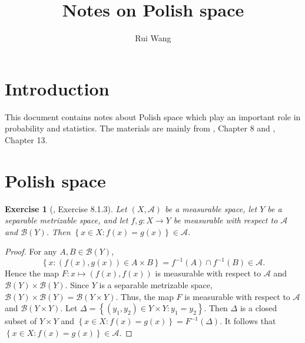 \documentclass[11pt]{article}
\theoremstyle{plain}
\newtheorem{exercise}{Exercise}
\theoremstyle{definition}
\theoremstyle{remark}
\begin{document}
\title{Notes on Polish space}

\author{Rui Wang}
\maketitle

\section{Introduction}
This document contains notes about Polish space which play an important role in probability and statistics.
The materials are mainly from \cite{book:992991}, Chapter 8 and \cite{dudleyProbability}, Chapter 13.

\section{Polish space}
\begin{exercise}[\cite{book:992991}, Exercise 8.1.3]
    Let $(X,\mathscr A)$ be a measurable space, let $Y$ be a separable metrizable space, and let $f,g: X \to Y$ be measurable with respect to $\mathscr A$ and $\mathscr B(Y)$.
    Then $\left\{ x\in X : f(x)=g(x) \right\} \in \mathscr A$.
\end{exercise}
\begin{proof}
    For any $A, B \in \mathscr B(Y)$,
    \begin{equation*}
        \left\{ x: (f(x),g(x)) \in A\times B \right\}
        = f^{-1}(A) \cap f^{-1}(B) \in \mathscr A.
    \end{equation*}
    Hence the map $F: x \mapsto (f(x),f(x))$ is measurable with respect to $\mathscr A$ and $\mathscr B (Y) \times \mathscr B (Y)$.
    Since $Y$ is a separable metrizable space, $\mathscr B (Y) \times \mathscr B (Y)= \mathscr B \left( Y\times Y \right)$.
    Thus, the map $F$ is measurable with respect to $\mathscr A$ and $\mathscr B (Y \times Y)$.
    Let $\Delta= \left\{ (y_1,y_2)\in Y \times Y: y_1=y_2 \right\}$.
    Then $\Delta$ is a closed subset of $Y \times Y$ and $\left\{ x\in X: f(x)=g(x) \right\}=F^{-1}(\Delta)$.
    It follows that $\left\{ x\in X: f(x)=g(x) \right\}\in \mathscr A$.
\end{proof}
\end{document}

